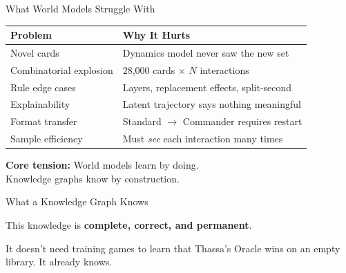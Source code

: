\documentclass[aspectratio=169, 11pt]{beamer}
\begin{document}
\begin{frame}{What World Models Struggle With}
  \begin{table}
    \centering\small
    \begin{tabular}{@{}lp{7cm}@{}}
      \toprule
      \textbf{Problem} & \textbf{Why It Hurts} \\
      \midrule
      Novel cards & Dynamics model never saw the new set \\
      Combinatorial explosion & 28,000 cards $\times$ $N$ interactions \\
      Rule edge cases & Layers, replacement effects, split-second \\
      Explainability & Latent trajectory says nothing meaningful \\
      Format transfer & Standard $\to$ Commander requires restart \\
      Sample efficiency & Must \textit{see} each interaction many times \\
      \bottomrule
    \end{tabular}
  \end{table}
  \vspace{0.5cm}
  \begin{center}
    \textbf{Core tension:} World models learn by doing.\\
    Knowledge graphs know by construction.
  \end{center}
\end{frame}

\begin{frame}{What a Knowledge Graph Knows}
  \vspace{0.5cm}

  This knowledge is \textbf{complete, correct, and permanent}.

  It doesn't need training games to learn that Thassa's Oracle wins on an empty library. It already knows.
\end{frame}
\end{document}
